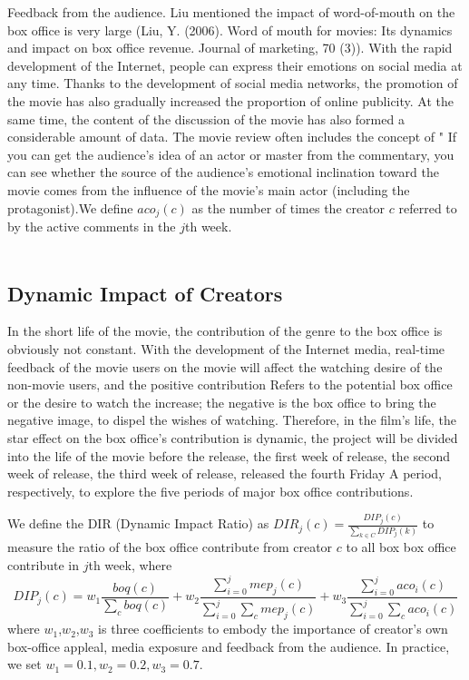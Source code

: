 \par Feedback from the audience. Liu mentioned the impact of word-of-mouth on the box office is very large (Liu, Y. (2006). Word of mouth for movies: Its dynamics and impact on box office revenue. Journal of marketing, 70 (3)). With the rapid development of the Internet, people can express their emotions on social media at any time. Thanks to the development of social media networks, the promotion of the movie has also gradually increased the proportion of online publicity. At the same time, the content of the discussion of the movie has also formed a considerable amount of data. The movie review often includes the concept of " If you can get the audience's idea of ​​an actor or master from the commentary, you can see whether the source of the audience's emotional inclination toward the movie comes from the influence of the movie's main actor (including the protagonist).We define $aco_j(c)$ as the number of times the creator $c$ referred to by the active comments in the $j$th week.\\\\
\subsection{Dynamic Impact of Creators}
\par In the short life of the movie, the contribution of the genre to the box office is obviously not constant. With the development of the Internet media, real-time feedback of the movie users on the movie will affect the watching desire of the non-movie users, and the positive contribution Refers to the potential box office or the desire to watch the increase; the negative is the box office to bring the negative image, to dispel the wishes of watching. Therefore, in the film's life, the star effect on the box office's contribution is dynamic, the project will be divided into the life of the movie before the release, the first week of release, the second week of release, the third week of release, released the fourth Friday A period, respectively, to explore the five periods of major box office contributions. \\
\par We define the DIR (Dynamic Impact Ratio) as $DIR_j(c)=\frac{DIP_j(c)}{\sum_{k\in C}DIP_j(k)}$ to measure the ratio of the box office contribute from creator $c$ to all box box office contribute in $j$th week, where 
\begin{equation}
DIP_j(c)=w_1\frac{boq(c)}{\sum_{c}boq(c)}+w_2\frac{\sum_{i=0}^{j}mep_j(c)}{\sum_{i=0}^{j}\sum_{c}mep_j(c)}+w_3\frac{\sum_{i=0}^{j}aco_i(c)}{\sum_{i=0}^{j}\sum_{c}aco_i(c)}
\end{equation}
where $w_1$,$w_2$,$w_3$ is three coefficients to embody the importance of creator's own box-office appleal, media exposure and feedback from the audience. In practice, we set $w_1=0.1,w_2=0.2,w_3=0.7$.

